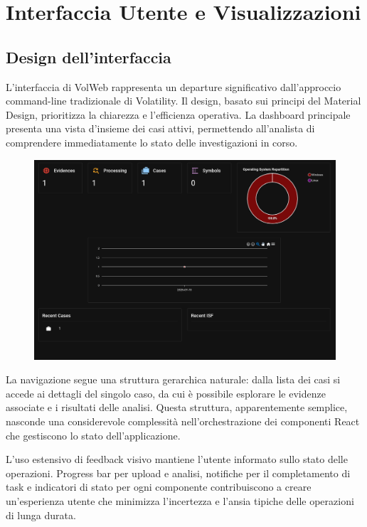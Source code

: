 \section{Interfaccia Utente e Visualizzazioni}

\subsection{Design dell'interfaccia}

L'interfaccia di VolWeb rappresenta un departure significativo dall'approccio command-line tradizionale di Volatility. Il design, basato sui principi del Material Design, prioritizza la chiarezza e l'efficienza operativa. La dashboard principale presenta una vista d'insieme dei casi attivi, permettendo all'analista di comprendere immediatamente lo stato delle investigazioni in corso.

\begin{figure}[H]
    \centering
    \includegraphics[width=1\linewidth]{images/volweb-original/volweb-dashboard.png}
\end{figure}

La navigazione segue una struttura gerarchica naturale: dalla lista dei casi si accede ai dettagli del singolo caso, da cui è possibile esplorare le evidenze associate e i risultati delle analisi. Questa struttura, apparentemente semplice, nasconde una considerevole complessità nell'orchestrazione dei componenti React che gestiscono lo stato dell'applicazione.

L'uso estensivo di feedback visivo mantiene l'utente informato sullo stato delle operazioni. Progress bar per upload e analisi, notifiche per il completamento di task e indicatori di stato per ogni componente contribuiscono a creare un'esperienza utente che minimizza l'incertezza e l'ansia tipiche delle operazioni di lunga durata.

